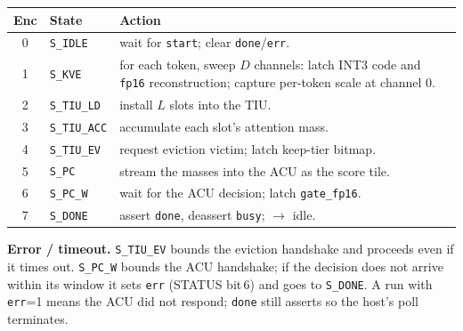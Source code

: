 \documentclass[11pt]{article}
\newcommand{\reg}[1]{\texttt{#1}}
\begin{document}
\begin{center}
\begin{tabular}{@{}clp{9.2cm}@{}}
\toprule
Enc & State & Action \\
\midrule
0 & \reg{S\_IDLE}    & wait for \reg{start}; clear \reg{done}/\reg{err}. \\
1 & \reg{S\_KVE}     & for each token, sweep $D$ channels: latch INT3 code and
  \reg{fp16} reconstruction; capture per-token scale at channel 0. \\
2 & \reg{S\_TIU\_LD} & install $L$ slots into the TIU. \\
3 & \reg{S\_TIU\_ACC}& accumulate each slot's attention mass. \\
4 & \reg{S\_TIU\_EV} & request eviction victim; latch keep-tier bitmap. \\
5 & \reg{S\_PC}      & stream the masses into the ACU as the score tile. \\
6 & \reg{S\_PC\_W}   & wait for the ACU decision; latch \reg{gate\_fp16}. \\
7 & \reg{S\_DONE}    & assert \reg{done}, deassert \reg{busy}; $\rightarrow$ idle. \\
\bottomrule
\end{tabular}
\end{center}

\begin{center}
\end{center}

\textbf{Error / timeout.} \reg{S\_TIU\_EV} bounds the eviction handshake and
proceeds even if it times out. \reg{S\_PC\_W} bounds the ACU handshake; if the
decision does not arrive within its window it sets \reg{err} (STATUS bit\,6) and
goes to \reg{S\_DONE}. A run with \reg{err}=1 means the ACU did not respond;
\reg{done} still asserts so the host's poll terminates.
\end{document}
